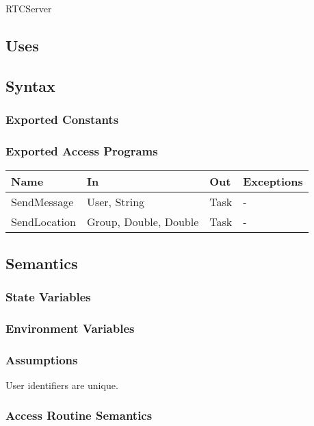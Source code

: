 \documentclass[12pt, titlepage]{article}
\begin{document}
\begin{itemize}
RTCServer

\subsection{Uses}

\subsection{Syntax}

\subsubsection{Exported Constants}

\subsubsection{Exported Access Programs}

\begin{center}
\begin{tabular}{p{2cm} p{4cm} p{4cm} p{2cm}}
\hline
\textbf{Name} & \textbf{In} & \textbf{Out} & \textbf{Exceptions} \\
\hline
SendMessage & User, String & Task & - \\
SendLocation & Group, Double, Double & Task & - \\

\hline
\end{tabular}
\end{center}

\subsection{Semantics}

\subsubsection{State Variables}

\subsubsection{Environment Variables}

\subsubsection{Assumptions}

User identifiers are unique.

\subsubsection{Access Routine Semantics}


\end{itemize}
\end{document}
